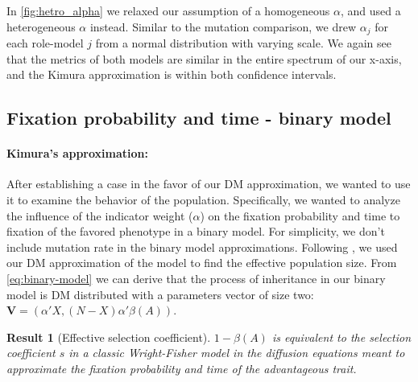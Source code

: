 \documentclass[12pt]{extarticle}
\let\vec\mathbf
\newtheorem{result}{Result}
\begin{document}
In \cref{fig:hetro_alpha} we relaxed our assumption of a homogeneous $\alpha$, and used a heterogeneous $\alpha$ instead. Similar to the mutation comparison, we drew $\alpha_j$ for each role-model $j$ from a normal distribution with varying scale. We again see that the metrics of both models are similar in the entire spectrum of our x-axis, and the Kimura approximation is within both confidence intervals.

\subsection*{Fixation probability and time - binary model}
\paragraph{Kimura's approximation:}
After establishing a case in the favor of our DM approximation, we wanted to use it to examine the behavior of the population. Specifically, we wanted to analyze the influence of the indicator weight ($\alpha$) on the fixation probability and time to fixation of the favored phenotype in a binary model.
For simplicity, we don't include mutation rate in the binary model approximations.
Following \citet{durret}, we used our DM approximation of the model to find the effective population size. From \cref{eq:binary-model} we can derive that the process of inheritance in our binary model is DM distributed with a parameters vector of size two: $\vec{V}=(\alpha'X,(N-X)\alpha'\beta(A))$.

\begin{result}[Effective selection coefficient]
$1-\beta(A)$ is equivalent to the selection coefficient $s$ in a classic Wright-Fisher model in the diffusion equations meant to approximate the fixation probability and time of the advantageous trait.
\end{result}
\end{document}
